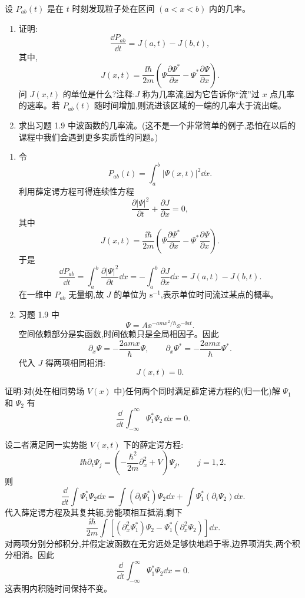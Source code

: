 \begin{question}
设 $P_{ab}(t)$ 是在 $t$ 时刻发现粒子处在区间 $(a<x<b)$ 内的几率。
\begin{enumerate}
\item 证明:
\[
\frac{\dd P_{ab}}{\dd t}=J(a,t)-J(b,t),
\]
其中,
\[
J(x,t)=\frac{\ii\hbar}{2m}\left(\Psi\frac{\partial\Psi^*}{\partial x}-\Psi^*\frac{\partial\Psi}{\partial x}\right).
\]
问 $J(x,t)$ 的单位是什么?注释:$J$ 称为几率流,因为它告诉你“流”过 $x$ 点几率的速率。若 $P_{ab}(t)$ 随时间增加,则流进该区域的一端的几率大于流出端。
\item 求出习题 1.9 中波函数的几率流。(这不是一个非常简单的例子,恐怕在以后的课程中我们会遇到更多实质性的问题。)
\end{enumerate}
\end{question}
\begin{solution}
\begin{enumerate}
\item 令
\[
P_{ab}(t)=\int_a^b |\Psi(x,t)|^2\dd x.
\]
利用薛定谔方程可得连续性方程
\[
\frac{\partial |\Psi|^2}{\partial t}+\frac{\partial J}{\partial x}=0,
\]
其中
\[
J(x,t)=\frac{\ii\hbar}{2m}\left(\Psi\frac{\partial\Psi^*}{\partial x}
-\Psi^*\frac{\partial\Psi}{\partial x}\right).
\]
于是
\[
\frac{\dd P_{ab}}{\dd t}=\int_a^b\frac{\partial |\Psi|^2}{\partial t}\dd x
=-\int_a^b\frac{\partial J}{\partial x}\dd x
=J(a,t)-J(b,t).
\]
在一维中 $P_{ab}$ 无量纲,故 $J$ 的单位为 $\mathrm{s}^{-1}$,表示单位时间流过某点的概率。
\item 习题 1.9 中
\[
\Psi=A\ee^{-amx^2/\hbar}\ee^{-\ii at}.
\]
空间依赖部分是实函数,时间依赖只是全局相因子。因此
\[
\partial_x\Psi=-\frac{2amx}{\hbar}\Psi,
\qquad
\partial_x\Psi^*=-\frac{2amx}{\hbar}\Psi^*.
\]
代入 $J$ 得两项相同相消:
\[
J(x,t)=0.
\]
\end{enumerate}
\end{solution}

\begin{question}
证明:对(处在相同势场 $V(x)$ 中)任何两个同时满足薛定谔方程的(归一化)解 $\Psi_1$ 和 $\Psi_2$ 有
\[
\frac{\dd}{\dd t}\int_{-\infty}^{\infty}\Psi_1^*\Psi_2\,\dd x=0.
\]
\end{question}
\begin{solution}
设二者满足同一实势能 $V(x,t)$ 下的薛定谔方程:
\[
\ii\hbar\partial_t\Psi_j=\left(-\frac{\hbar^2}{2m}\partial_x^2+V\right)\Psi_j,
\qquad j=1,2.
\]
则
\[
\frac{\dd}{\dd t}\int\Psi_1^*\Psi_2\dd x
=\int (\partial_t\Psi_1^*)\Psi_2\dd x+
\int\Psi_1^*(\partial_t\Psi_2)\dd x.
\]
代入薛定谔方程及其复共轭,势能项相互抵消,剩下
\[
\frac{\ii\hbar}{2m}\int \left[(\partial_x^2\Psi_1^*)\Psi_2-
\Psi_1^*(\partial_x^2\Psi_2)\right]\dd x.
\]
对两项分别分部积分,并假定波函数在无穷远处足够快地趋于零,边界项消失,两个积分相消。因此
\[
\frac{\dd}{\dd t}\int_{-\infty}^{\infty}\Psi_1^*\Psi_2\dd x=0.
\]
这表明内积随时间保持不变。
\end{solution}

